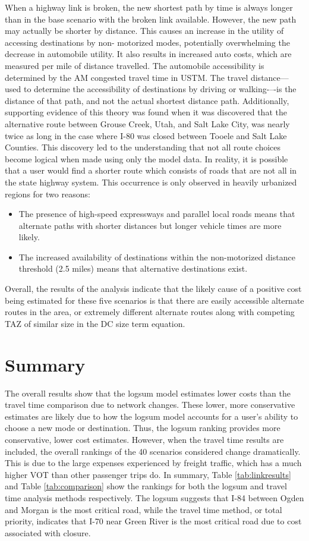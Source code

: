 When a highway link is broken, the new
shortest path by time is always longer than in the base scenario with the broken link
available. However, the new path may actually be shorter by distance. This
causes an increase in the utility of accessing destinations by non-
motorized modes, potentially overwhelming the decrease in automobile
utility. It also results in increased auto costs, which are measured per
mile of distance travelled. The automobile accessibility is determined by the AM congested
travel time in USTM. The travel distance–--used to determine the accessibility of destinations by driving or
walking-–-is the distance of that path, and not the actual shortest
distance path. Additionally,
supporting evidence of this theory was found when it was discovered that
the alternative route between Grouse Creek, Utah, and Salt Lake City,
was nearly twice as long in the case where I-80 was closed between
Tooele and Salt Lake Counties. This discovery led to the understanding that not all
route choices become logical when made using only the model data. In
reality, it is possible that a user would find a shorter route
which consists of roads that are not all in the state highway system.
This occurrence is only observed in heavily urbanized regions for two reasons:
\begin{itemize}
	\item The presence of high-speed expressways and parallel local roads
  means that alternate paths with shorter distances but longer vehicle
  times are more likely.
	\item The increased availability of destinations within the non-motorized
  distance threshold (2.5 miles) means that alternative
  destinations exist.
\end{itemize}

Overall, the results of the analysis indicate that the likely cause of a
positive cost being estimated for these five scenarios is that there are
easily
accessible alternate routes in the area, or extremely different alternate
routes along with competing TAZ of similar size in the DC size term
equation.

\section{Summary}

The overall results show that the logsum model estimates lower costs than the
travel time comparison due to network changes. These lower, more conservative
estimates are likely due to how the logsum model accounts for a user's
ability to choose a new mode or destination. Thus, the logsum ranking provides more
conservative, lower cost estimates. However, when the travel time results are included, the
overall rankings of the 40 scenarios considered change dramatically. This
is due to the large expenses experienced by freight traffic, which has a
much higher VOT than other passenger trips do. In summary, Table
\ref{tab:linkresults} and Table \ref{tab:comparison} show the rankings
for both the logsum and travel time analysis methods respectively. The
logsum suggests that I-84 between Ogden and Morgan is the most critical
road, while the travel time method, or total priority, indicates that I-70
near Green River is the most critical road due to cost associated with
closure.
